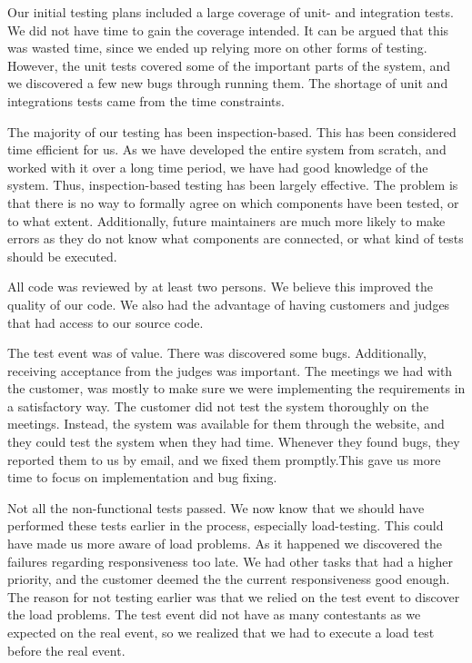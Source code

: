 Our initial testing plans included a large coverage of unit- and
integration tests. We did not have time to gain the coverage intended.
It can be argued that this was wasted time, since we ended up relying
more on other forms of testing. However, the unit tests covered some of
the important parts of the system, and we discovered a few new bugs
through running them. The shortage of unit and integrations tests came
from the time constraints.

The majority of our testing has been inspection-based. This has been
considered time efficient for us. As we have developed the entire
system from scratch, and worked with it over a long time period, we
have had good knowledge of the system. Thus, inspection-based testing
has been largely effective. The problem is that there is no way to
formally agree on which components have been tested, or to what extent.
Additionally, future maintainers are much more likely to make errors as
they do not know what components are connected, or what kind of tests
should be executed.

All code was reviewed by at least two persons. We believe this improved
the quality of our code. We also had the advantage of having customers
and judges that had access to our source code. \ \ 

The test event was of value. There was discovered some bugs.
Additionally, receiving acceptance from the judges was important. The
meetings we had with the customer, was mostly to make sure we were
implementing the requirements in a satisfactory way. The customer did
not test the system thoroughly on the meetings. Instead, the system was
available for them through the website, and they could test the system
when they had time. Whenever they found bugs, they reported them to us
by email, and we fixed them promptly.This gave us more time to focus on
implementation and bug fixing.

Not all the non-functional tests passed. We now know that we should have
performed these tests earlier in the process, especially load-testing.
This could have made us more aware of load problems. As it happened we
discovered the failures regarding responsiveness too late. We had other
tasks that had a higher priority, and the customer deemed the the
current responsiveness good enough. The reason for not testing earlier
was that we relied on the test event to discover the load problems. The
test event did not have as many contestants as we expected on the real
event, so we realized that we had to execute a load test before the
real event.


